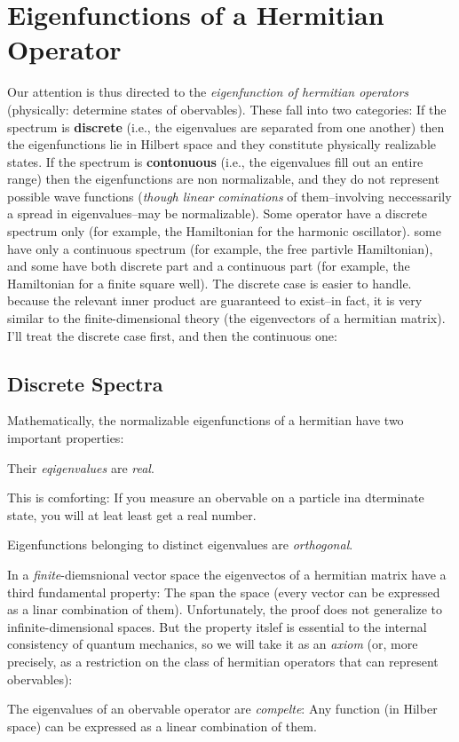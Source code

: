 \section{Eigenfunctions of a Hermitian Operator}
Our attention is thus directed to the \textit{eigenfunction of hermitian operators} (physically: determine states of obervables). These fall into two categories: If the spectrum is \textbf{discrete} (i.e., the eigenvalues are separated from one another) then the eigenfunctions lie in Hilbert space and they constitute physically realizable states. If the spectrum is \textbf{contonuous} (i.e., the eigenvalues fill out an entire range) then the eigenfunctions are non normalizable, and they do not represent possible wave functions (\textit{though linear cominations} of them--involving neccessarily a spread in eigenvalues--may be normalizable). Some operator have a discrete spectrum only (for example, the Hamiltonian for the harmonic oscillator). some have only a continuous spectrum (for example, the free partivle Hamiltonian), and some have both discrete part and a continuous part (for example, the Hamiltonian for a finite square well). The discrete case is easier to handle. because the relevant inner product are guaranteed to exist--in fact, it is very similar to the finite-dimensional theory (the eigenvectors of a hermitian matrix). I'll treat the discrete case first, and then the continuous one:

\subsection{Discrete Spectra}
Mathematically, the normalizable eigenfunctions of a hermitian have two important properties:
\begin{teo}
	Their \textit{eqigenvalues} are \textit{real}.
\end{teo}
This is comforting: If you measure an obervable on a particle ina  dterminate state, you will at leat least get a real number.
\begin{teo}
	Eigenfunctions belonging to distinct eigenvalues are \textit{orthogonal}.
\end{teo}
In  a \textit{finite}-diemsnional vector space the eigenvectos of a hermitian matrix have a third fundamental property: The span the space (every vector can be expressed as a linar combination of them). Unfortunately, the proof does not generalize to infinite-dimensional spaces. But the property itslef is essential to the internal consistency of quantum mechanics, so we will take it as an \textit{axiom} (or, more precisely, as a restriction on the class of hermitian operators that can represent obervables):
\begin{axiom}
	The eigenvalues of an obervable operator are \textit{compelte}: Any function (in Hilber space) can be expressed as a linear combination of them.
\end{axiom}

